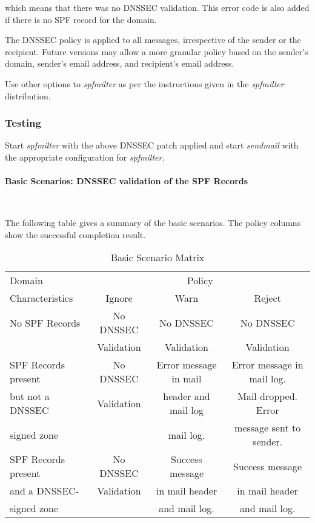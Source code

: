 \documentclass[12pt]{article}
\newcommand{\cmd}[1]{{\em #1}}
\begin{document}
which means that there was no DNSSEC validation.  This error code is also
added if there is no SPF record for the domain.

The DNSSEC policy is applied to all messages, irrespective of the sender or the
recipient.  Future versions may allow a more granular policy based on the
sender's domain, sender's email address, and recipient's email address.

Use other options to \cmd{spfmilter} as per the instructions given in the
\cmd{spfmilter} distribution.


\subsubsection{Testing}

Start \cmd{spfmilter} with the above DNSSEC patch applied and start
\cmd{sendmail} with the appropriate configuration for \cmd{spfmilter}.


\paragraph{Basic Scenarios: DNSSEC validation of the SPF Records \\}\verb" "

The following table gives a summary of the basic scenarios.  The policy columns show the successful completion result.

\begin{table}[hb]
\begin{center}
\begin{tabular}{|l|c|c|c|}
\hline
Domain		& \multicolumn{3}{c|}{Policy}	\\
\cline{2-4}
Characteristics	& Ignore & Warn & Reject \\
\hline

No SPF Records & No DNSSEC  & No DNSSEC		& No DNSSEC	\\
	       & Validation & Validation	& Validation	\\
\hline

SPF Records present & No DNSSEC	 & Error message in mail & Error message in mail log. \\
but not a DNSSEC    & Validation & header and mail log   & Mail dropped.  Error \\
signed zone	    &	         & mail log.	         & message sent to sender. \\
\hline

SPF Records present & No DNSSEC  & Success message & Success message \\
and a DNSSEC-	    & Validation & in mail header  & in mail header \\
signed zone	    &		 & and mail log.   & and mail log. \\
\hline

\end{tabular}
\caption{Basic Scenario Matrix}
\label{basicmatrix}
\end{center}
\end{table}
\end{document}
